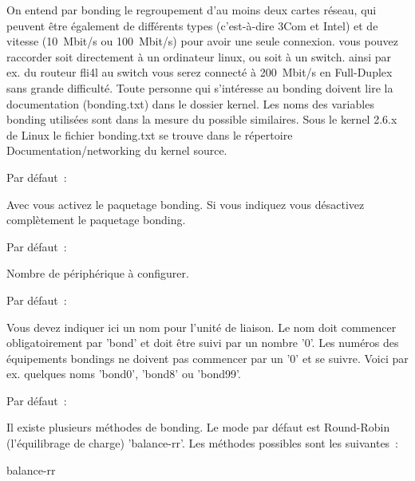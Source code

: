 On entend par bonding le regroupement d'au moins deux cartes réseau, qui peuvent
être également de différents types (c'est-à-dire 3Com et Intel) et de vitesse
(10~Mbit/s ou 100~Mbit/s) pour avoir une seule connexion. vous pouvez raccorder
soit directement à un ordinateur linux, ou soit à un switch. ainsi par ex. du
routeur fli4l au switch vous serez connecté à 200~Mbit/s en Full-Duplex sans
grande difficulté. Toute personne qui s'intéresse au bonding doivent lire la
documentation (bonding.txt) dans le dossier kernel. Les noms des variables bonding
utilisées sont dans la mesure du possible similaires. Sous le kernel 2.6.x de
Linux le fichier bonding.txt se trouve dans le répertoire Documentation/networking
du kernel source.
\begin{description}


  Par défaut~: 

  Avec  vous activez le paquetage bonding. Si vous indiquez
   vous désactivez complètement le paquetage bonding.


  Par défaut~: 

  Nombre de périphérique à configurer.


  Par défaut~: 

  Vous devez indiquer ici un nom pour l'unité de liaison. Le nom doit commencer
  obligatoirement par 'bond' et doit être suivi par un nombre '0'. Les numéros des
  équipements bondings ne doivent pas commencer par un '0' et se suivre. Voici
  par ex. quelques noms 'bond0', 'bond8' ou 'bond99'.


  Par défaut~: 

  Il existe plusieurs méthodes de bonding. Le mode par défaut est Round-Robin
  (l'équilibrage de charge) 'balance-rr'. Les méthodes possibles sont les suivantes~:

\begin{description}

\item [balance-rr]


\end{description}
\end{description}
